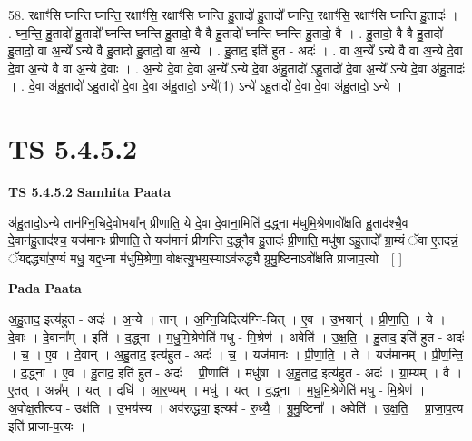 \documentclass[17pt]{extarticle}
\begin{document}
58. रक्षाꣳ॑सि घ्नन्ति घ्नन्ति॒ रक्षाꣳ॑सि॒ रक्षाꣳ॑सि घ्नन्ति हु॒तादो॑ हु॒तादो᳚ घ्नन्ति॒ रक्षाꣳ॑सि॒ रक्षाꣳ॑सि घ्नन्ति हु॒तादः॑ । . घ्न॒न्ति॒ हु॒तादो॑ हु॒तादो᳚ घ्नन्ति घ्नन्ति हु॒तादो॒ वै वै हु॒तादो᳚ घ्नन्ति घ्नन्ति हु॒तादो॒ वै । . हु॒तादो॒ वै वै हु॒तादो॑ हु॒तादो॒ वा अ॒न्ये᳚ ऽन्ये वै हु॒तादो॑ हु॒तादो॒ वा अ॒न्ये । . हु॒ताद॒ इति॑ हुत - अदः॑ । . वा अ॒न्ये᳚ ऽन्ये वै वा अ॒न्ये दे॒वा दे॒वा अ॒न्ये वै वा अ॒न्ये दे॒वाः । . अ॒न्ये दे॒वा दे॒वा अ॒न्ये᳚ ऽन्ये दे॒वा अ॑हु॒तादो॑ ऽहु॒तादो॑ दे॒वा अ॒न्ये᳚ ऽन्ये दे॒वा अ॑हु॒तादः॑ । . दे॒वा अ॑हु॒तादो॑ ऽहु॒तादो॑ दे॒वा दे॒वा अ॑हु॒तादो॒ ऽन्ये᳚(1॒) ऽन्ये॑ ऽहु॒तादो॑ दे॒वा दे॒वा अ॑हु॒तादो॒ ऽन्ये । \newline
\pagebreak
{}

\section{ TS 5.4.5.2 }

\textbf{TS 5.4.5.2 } \newline
\textbf{Samhita Paata} \newline

अ॑हु॒तादो॒ऽन्ये तान॑ग्नि॒चिदे॒वोभया᳚न् प्रीणाति॒ ये दे॒वा दे॒वाना॒मिति॑ द॒द्ध्ना म॑धुमि॒श्रेणावो᳚क्षति हु॒ताद॑श्चै॒व दे॒वान॑हु॒ताद॑श्च॒ यज॑मानः प्रीणाति॒ ते यज॑मानं प्रीणन्ति द॒द्ध्नैव हु॒तादः॑ प्री॒णाति॒ मधु॑षा ऽहु॒तादो᳚ ग्रा॒म्यं ॅवा ए॒तदन्नं॒ ॅयद्दद्ध्या॑र॒ण्यं मधु॒ यद्द॒ध्ना म॑धुमि॒श्रेणा॒-वोक्ष॑त्यु॒भय॒स्याऽव॑रुद्ध्यै ग्रुमु॒ष्टिनाऽवो᳚क्षति प्राजाप॒त्यो - [  ] \newline

\textbf{Pada Paata} \newline

अ॒हु॒ताद॒ इत्य॑हुत - अदः॑ । अ॒न्ये । तान् । अ॒ग्नि॒चिदित्य॑ग्नि-चित् । ए॒व । उ॒भयान्॑ । प्री॒णा॒ति॒ । ये । दे॒वाः । दे॒वाना᳚म् । इति॑ । द॒द्ध्ना । म॒धु॒मि॒श्रेणेति॑ मधु - मि॒श्रेण॑ । अवेति॑ । उ॒क्ष॒ति॒ । हु॒ताद॒ इति॑ हुत - अदः॑ । च॒ । ए॒व । दे॒वान् । अ॒हु॒ताद॒ इत्य॑हुत - अदः॑ । च॒ । यज॑मानः । प्री॒णा॒ति॒ । ते । यज॑मानम् । प्री॒ण॒न्ति॒ । द॒द्ध्ना । ए॒व । हु॒ताद॒ इति॑ हुत - अदः॑ । प्री॒णाति॑ । मधु॑षा । अ॒हु॒ताद॒ इत्य॑हुत - अदः॑ । ग्रा॒म्यम् । वै । ए॒तत् । अन्न᳚म् । यत् । दधि॑ । आ॒र॒ण्यम् । मधु॑ । यत् । द॒द्ध्ना । म॒धु॒मि॒श्रेणेति॑ मधु - मि॒श्रेण॑ । अ॒वोक्ष॒तीत्य॑व - उक्ष॑ति । उ॒भय॑स्य । अव॑रुद्ध्या॒ इत्यव॑ - रु॒ध्यै॒ । ग्रु॒मु॒ष्टिना᳚ । अवेति॑ । उ॒क्ष॒ति॒ । प्रा॒जा॒प॒त्य इति॑ प्राजा-प॒त्यः ।  \newline
\end{document}

